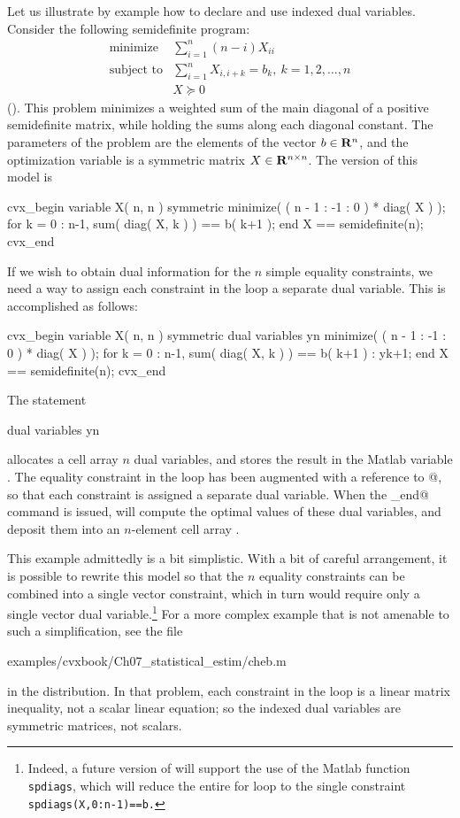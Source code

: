 \documentclass[12pt]{article}
\begin{document}
Let us illustrate by example how to declare and use indexed dual
variables. Consider the following semidefinite program:
\begin{equation}
	\begin{array}{ll}
		\text{minimize}   & \sum_{i=1}^n (n-i) X_{ii} \\
		\text{subject to} & \sum_{i=1}^n X_{i,i+k} = b_k, ~ k = 1,2,\dots,n \\
				  & X \succeq 0
	\end{array}
\end{equation}
(\cite{Stu:99}). This problem minimizes a weighted sum of the main diagonal
of a positive semidefinite matrix, while holding the sums along each diagonal
constant. The parameters of the problem are
the elements of the vector $b\in\mathbf{R}^{n}$, and the optimization variable is a
symmetric matrix $X\in\mathbf{R}^{{n}\times{n}}$. The \cvx version of this model is
\begin{code}
	cvx_begin
	    variable X( n, n ) symmetric
	    minimize( ( n - 1 : -1 : 0 ) * diag( X ) );
	    for k = 0 : n-1,
	        sum( diag( X, k ) ) == b( k+1 );
	    end
	    X == semidefinite(n);
	cvx_end
\end{code}
If we wish to obtain dual information for the $n$ simple equality constraints,
we need a way to assign each constraint in the \verb@for@ loop a separate dual variable.
This is accomplished as follows:
\begin{code}
	cvx_begin
	    variable X( n, n ) symmetric
	    dual variables y{n}
	    minimize( ( n - 1 : -1 : 0 ) * diag( X ) );
	    for k = 0 : n-1,
	        sum( diag( X, k ) ) == b( k+1 ) : y{k+1};
	    end
	    X == semidefinite(n);
	cvx_end
\end{code}
The statement
\begin{code}
	dual variables y{n}
\end{code}
allocates a cell array $n$ dual variables, and stores the result in the Matlab
variable \verb@Z@. The equality constraint in the \verb@for@ loop has been augmented
with a reference to @, so that each constraint is assigned a separate
dual variable.
When the \verb@cvx_end@ command is issued, \cvx will compute the optimal values
of these dual variables, and deposit them into an $n$-element cell array \verb@y@.

This example admittedly is a bit simplistic. With a bit of careful arrangement,
it is possible to rewrite this model so that the $n$ equality constraints can be
combined into a single vector constraint, which in turn would require only a single
vector dual variable.\footnote{Indeed, a future version of \cvx will support the
use of the Matlab function \texttt{spdiags}, which will reduce the entire for loop
to the single constraint \texttt{spdiags(X,0:n-1)==b.}} For a more complex example
that is not amenable to such a simplification, see the file
\begin{code}
	examples/cvxbook/Ch07_statistical_estim/cheb.m
\end{code}
in the \cvx distribution.
In that problem, each constraint in the \verb@for@ loop is a linear matrix
inequality, not a scalar linear equation;
so the indexed dual variables are symmetric matrices, not scalars.
\end{document}
